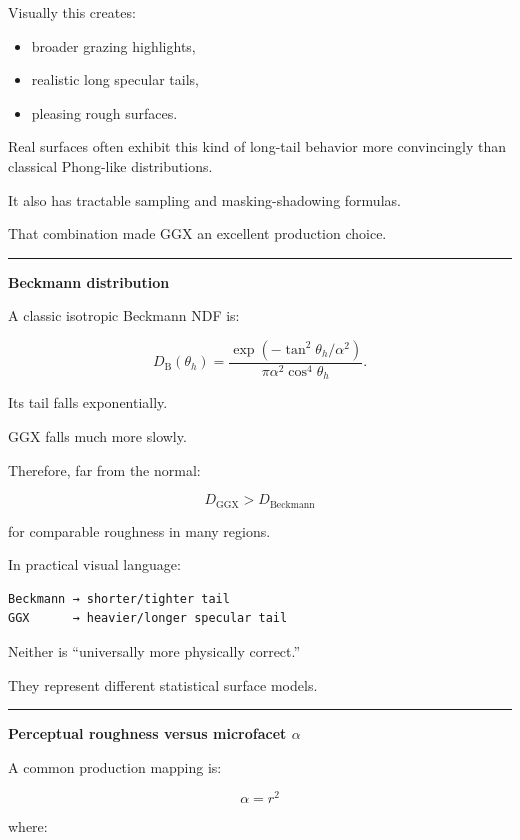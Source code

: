 Visually this creates:

\begin{itemize}
\tightlist
\item
  broader grazing highlights,
\item
  realistic long specular tails,
\item
  pleasing rough surfaces.
\end{itemize}

Real surfaces often exhibit this kind of long-tail behavior more convincingly than classical Phong-like distributions.

It also has tractable sampling and masking-shadowing formulas.

That combination made GGX an excellent production choice.

\begin{center}\rule{0.5\linewidth}{0.5pt}\end{center}

\textbf{Beckmann distribution}

A classic isotropic Beckmann NDF is:

\[
\boxed{
D_{\mathrm B}(\theta_h)
=
\frac{
\exp\left(
-\tan^2\theta_h/\alpha^2
\right)
}{
\pi\alpha^2\cos^4\theta_h
}.
}
\]

Its tail falls exponentially.

GGX falls much more slowly.

Therefore, far from the normal:

\[
D_{\mathrm{GGX}}
>
D_{\mathrm{Beckmann}}
\]

for comparable roughness in many regions.

In practical visual language:

\begin{verbatim}
Beckmann → shorter/tighter tail
GGX      → heavier/longer specular tail
\end{verbatim}

Neither is ``universally more physically correct.''

They represent different statistical surface models.

\begin{center}\rule{0.5\linewidth}{0.5pt}\end{center}

\textbf{Perceptual roughness versus microfacet \(\alpha\)}

A common production mapping is:

\[
\boxed{
\alpha=r^2
}
\]

where:

